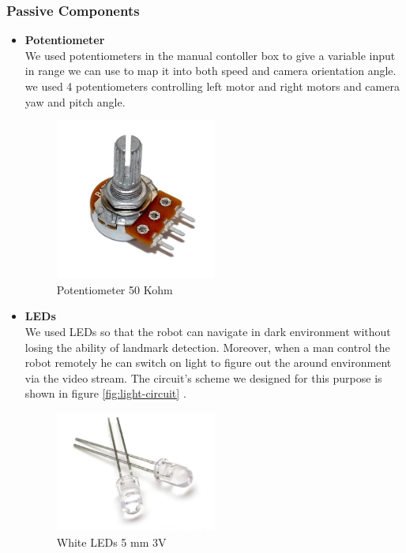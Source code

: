 \documentclass[12pt]{article}
\begin{document}
\subsubsection{Passive Components}
\begin{itemize}
	\item \textbf{Potentiometer}\\
	We used potentiometers in the manual contoller box to give a variable input in range we can use to map it into both speed and camera orientation angle. we used 4 potentiometers controlling left motor and right motors and camera yaw and pitch angle.
	\begin{figure}[H]
		\centering
		\includegraphics[width =0.5\textwidth]{Fig/Electronics/pot.jpg}
		\caption{Potentiometer 50 Kohm }
		\label{fig:pot}
	\end{figure}

	\item \textbf{LEDs}\\
	We used LEDs so that the robot can navigate in dark environment without losing the ability of landmark detection. Moreover, when a man control the robot remotely he can switch on light to figure out the around environment via the video stream. The circuit's scheme we designed for this purpose is shown in figure \ref{fig:light-circuit} .
	\begin{figure}[H]
		\centering
		\includegraphics[width =0.5\textwidth]{Fig/Electronics/LED.jpg}
		\caption{White LEDs 5 mm 3V}
		\label{fig:led}
	\end{figure}


\end{itemize}
\end{document}
